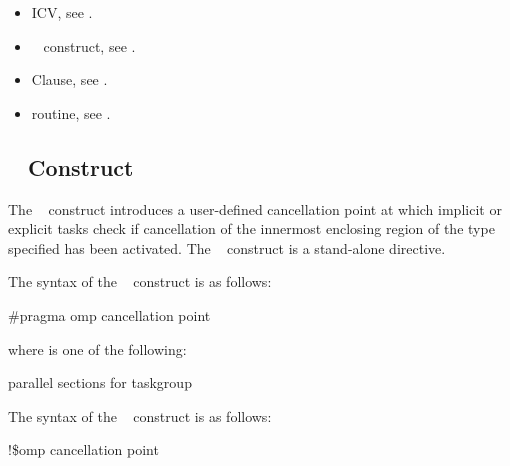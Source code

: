 {{{{\crossreferences
\begin{itemize}
\item {} ICV, see
.

\item {}~ construct, see 
.

\item {} Clause, see .

\item {} routine, see 
.
\end{itemize}









\subsection{~ Construct}
\label{subsec:cancellation point Construct}
\summary
The ~ construct introduces a user-defined cancellation point at 
which implicit or explicit tasks check if cancellation of the innermost enclosing region 
of the type specified has been activated. The ~ construct is a 
stand-alone directive.

\syntax
\ccppspecificstart
The syntax of the ~ construct is as follows:

\begin{boxedcode}
\#pragma omp cancellation point 
\end{boxedcode}

where  is one of the following:

\begin{indentedcodelist}
parallel
sections
for
taskgroup
\end{indentedcodelist}
\ccppspecificend

\fortranspecificstart
The syntax of the ~ construct is as follows:

\begin{boxedcode}
!\$omp cancellation point 
\end{boxedcode}

}}}}
